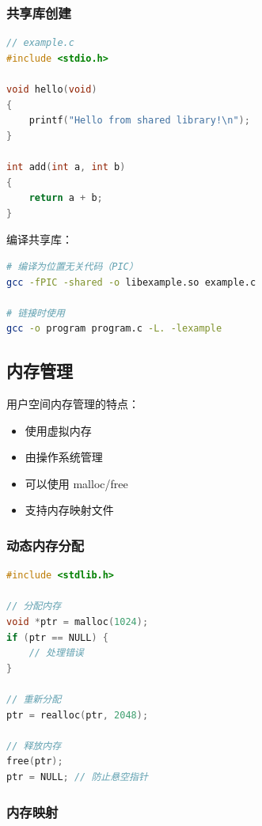 \subsubsection{共享库创建}

\begin{lstlisting}[language=C]
// example.c
#include <stdio.h>

void hello(void)
{
    printf("Hello from shared library!\n");
}

int add(int a, int b)
{
    return a + b;
}
\end{lstlisting}

编译共享库：
\begin{lstlisting}[language=bash]
# 编译为位置无关代码（PIC）
gcc -fPIC -shared -o libexample.so example.c

# 链接时使用
gcc -o program program.c -L. -lexample
\end{lstlisting}

\subsection{内存管理}


用户空间内存管理的特点：
\begin{itemize}
  \item 使用虚拟内存
  \item 由操作系统管理
  \item 可以使用 malloc/free
  \item 支持内存映射文件
\end{itemize}

\subsubsection{动态内存分配}

\begin{lstlisting}[language=C]
#include <stdlib.h>

// 分配内存
void *ptr = malloc(1024);
if (ptr == NULL) {
    // 处理错误
}

// 重新分配
ptr = realloc(ptr, 2048);

// 释放内存
free(ptr);
ptr = NULL; // 防止悬空指针
\end{lstlisting}

\subsubsection{内存映射}


